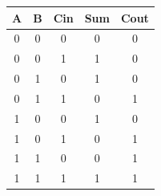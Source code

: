 \documentclass[11pt]{article}
\begin{document}
\begin{table}[H]
	\begin{tabular}{|c|c|c|c|c|}
		\hline
		{\color[HTML]{000000} \textbf{A}} & {\color[HTML]{000000} \textbf{B}} & {\color[HTML]{000000} \textbf{Cin}} & {\color[HTML]{000000} \textbf{Sum}} & {\color[HTML]{000000} \textbf{Cout}} \\ \hline
		{\color[HTML]{000000} 0}          & {\color[HTML]{000000} 0}          & {\color[HTML]{000000} 0}            & {\color[HTML]{F56B00} 0}            & {\color[HTML]{F56B00} 0}             \\ \hline
		{\color[HTML]{000000} 0}          & {\color[HTML]{000000} 0}          & {\color[HTML]{000000} 1}            & {\color[HTML]{F56B00} 1}            & {\color[HTML]{F56B00} 0}             \\ \hline
		{\color[HTML]{000000} 0}          & {\color[HTML]{000000} 1}          & {\color[HTML]{000000} 0}            & {\color[HTML]{F56B00} 1}            & {\color[HTML]{F56B00} 0}             \\ \hline
		{\color[HTML]{000000} 0}          & {\color[HTML]{000000} 1}          & {\color[HTML]{000000} 1}            & {\color[HTML]{F56B00} 0}            & {\color[HTML]{F56B00} 1}             \\ \hline
		{\color[HTML]{000000} 1}          & {\color[HTML]{000000} 0}          & {\color[HTML]{000000} 0}            & {\color[HTML]{F56B00} 1}            & {\color[HTML]{F56B00} 0}             \\ \hline
		{\color[HTML]{000000} 1}          & {\color[HTML]{000000} 0}          & {\color[HTML]{000000} 1}            & {\color[HTML]{F56B00} 0}            & {\color[HTML]{F56B00} 1}             \\ \hline
		{\color[HTML]{000000} 1}          & {\color[HTML]{000000} 1}          & {\color[HTML]{000000} 0}            & {\color[HTML]{F56B00} 0}            & {\color[HTML]{F56B00} 1}             \\ \hline
		{\color[HTML]{000000} 1}          & {\color[HTML]{000000} 1}          & {\color[HTML]{000000} 1}            & {\color[HTML]{F56B00} 1}            & {\color[HTML]{F56B00} 1}             \\ \hline
	\end{tabular}
\end{table}
\end{document}
